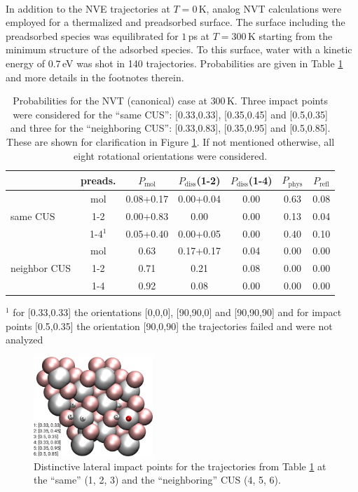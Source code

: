 \documentclass[11pt,DIV=13,BCOR=5mm,a4paper,headinclude]{scrbook}
\begin{document}
\\
In addition to the NVE trajectories at $T=0\,$K, analog NVT calculations were employed for a thermalized and preadsorbed surface.
The surface including the preadsorbed species was equilibrated for $1\,$ps at $T=300\,$K starting from the minimum structure of the adsorbed species.
To this surface, water with a kinetic energy of $0.7\,$eV was shot in 140 trajectories.
Probabilities are given in Table \ref{tab:enh_can} and more details in the footnotes therein.
\begin{table}[hbt]
 \centering
  \caption{
  Probabilities for the NVT (canonical) case at $300\,$K.
Three impact points were considered for the ``same CUS'': [0.33,0.33], [0.35,0.45] and [0.5,0.35]  and three for the ``neighboring CUS'': [0.33,0.83], [0.35,0.95] and [0.5,0.85].
These are shown for clarification in Figure \ref{fig:impact}.
If not mentioned otherwise, all eight rotational orientations were considered.}
 \begin{tabular}{l|c|ccccc}
\toprule
& preads. &$P_\textrm{mol}$ & $P_\textrm{diss}$(1-2) &  $P_\textrm{diss}$(1-4) & $P_\textrm{phys}$ & $P_\textrm{refl}$ \\\midrule
\multirow{3}{*}{same CUS}& mol &0.08+0.17 & 0.00+0.04 & 0.00 &  0.63 & 0.08 \\
& 1-2 &0.00+0.83 & 0.00 & 0.00 &  0.13 & 0.04 \\
& 1-4$^1$ &0.05+0.40 & 0.00+0.05 & 0.00 & 0.40 & 0.10 \\\midrule
\multirow{3}{*}{neighbor CUS}& mol &0.63 & 0.17+0.17 & 0.04  & 0.00 & 0.00 \\
& 1-2 & 0.71 & 0.21 & 0.08& 0.00 & 0.00\\
& 1-4 & 0.92 & 0.08 & 0.00 & 0.00 & 0.00\\\bottomrule
\end{tabular}
\begin{tablenotes}
 \footnotesize
\item[] $^1$ for [0.33,0.33] the orientations [0,0,0], [90,90,0] and [90,90,90] and for impact points [0.5,0.35] the orientation [90,0,90] the trajectories failed and were not analyzed
\end{tablenotes}
 \label{tab:enh_can}
\end{table}
\begin{figure}[!h]
 \centering
 \includegraphics[width=0.4\textwidth]{figures/0001/points_same_other.png}
 \caption{Distinctive lateral impact points for the trajectories from Table \ref{tab:enh_can} at the ``same'' (1, 2, 3) and the ``neighboring'' CUS (4, 5, 6).}
 \label{fig:impact}
 \end{figure}
\end{document}

